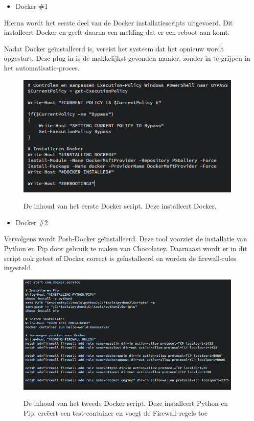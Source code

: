 \begin{itemize}[noitemsep]
	\item Docker \#1
\end{itemize}

Hierna wordt het eerste deel van de Docker installatiescripts uitgevoerd. Dit installeert Docker en geeft daarna een melding dat er een reboot aan komt.

Nadat Docker geïnstalleerd is, vereist het systeem dat het opnieuw wordt opgestart. Deze plug-in is de makkelijkst gevonden manier, zonder in te grijpen in het automatisatie-proces.

\begin{figure}
	\centering
	\caption{De inhoud van het eerste Docker script. Deze installeert Docker.}
	\includegraphics[scale=0.6]{img/docker01}
	\label{docker01}
\end{figure}

\begin{itemize}[noitemsep]
	\item Docker \#2
\end{itemize}

Vervolgens wordt Posh-Docker geïnstalleerd. Deze tool voorziet de installatie van Python en Pip door gebruik te maken van Chocolatey. Daarnaast wordt er in dit script ook getest of Docker correct is geïnstalleerd en worden de firewall-rules ingesteld.

\begin{figure}
	\centering
	\caption{De inhoud van het tweede Docker script. Deze installeert Python en Pip, creëert een test-container en voegt  de Firewall-regels toe}
	\includegraphics[scale=0.6]{img/docker02}
	\label{docker02}
\end{figure}

